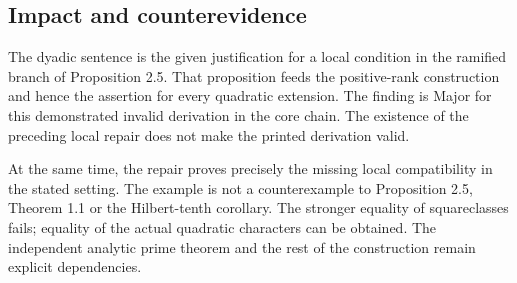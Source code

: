 \documentclass[10pt]{article}
\begin{document}
\subsection*{Impact and counterevidence}
The dyadic sentence is the given justification for a local condition in the ramified branch of Proposition 2.5. That proposition feeds the positive-rank construction and hence the assertion for every quadratic extension. The finding is Major for this demonstrated invalid derivation in the core chain. The existence of the preceding local repair does not make the printed derivation valid.\par
At the same time, the repair proves precisely the missing local compatibility in the stated setting. The example is not a counterexample to Proposition 2.5, Theorem 1.1 or the Hilbert-tenth corollary. The stronger equality of squareclasses fails; equality of the actual quadratic characters can be obtained. The independent analytic prime theorem and the rest of the construction remain explicit dependencies.\par
\end{document}
